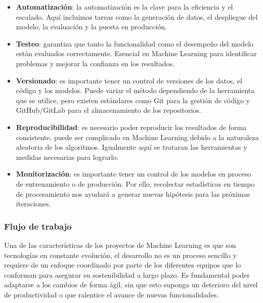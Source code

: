 \begin{itemize}
    \item \textbf{Automatización}: la automatización es la clave para la eficiencia y el escalado.
          Aquí incluimos tareas como la generación de datos, el despliegue del modelo, la evaluación y
          la puesta en producción.
    \item \textbf{Testeo}: garantiza que tanto la funcionalidad como el desempeño del modelo están evaluados correctamente.
          Esencial en Machine Learning para identificar problemas y mejorar la confianza en los resultados.
    \item \textbf{Versionado}: es importante tener un control de versiones de los datos, el código y los modelos.
          Puede variar el método dependiendo de la herramienta que se utilice, pero existen estándares como Git para la gestión
          de código y GitHub/GitLab para el almacenamiento de los repositorios.
    \item \textbf{Reproducibilidad}: es necesario poder reproducir los resultados de forma consistente, puede ser
          complicado en Machine Learning debido a la naturaleza aleatoria de los algoritmos. Igualmente aquí se trataran
          las herramientas y medidas necesarias para lograrlo.
    \item \textbf{Monitorización}: es importante tener un control de los modelos en proceso de entrenamiento o de producción.
          Por ello, recolectar estadísticas en tiempo de procesamiento nos ayudará a generar nuevas hipótesis para las próximas 
          iteraciones.
\end{itemize}

\subsubsection{Flujo de trabajo}
Una de las características de los proyectos de Machine Learning es que son tecnologías en constante evolución, el
desarrollo no es un proceso sencillo y requiere de un enfoque coordinado por parte de los diferentes
equipos que lo conforman para asegurar su sostenibilidad a largo plazo. Es fundamental poder adaptarse a los cambios
de forma ágil, sin que esto suponga un deterioro del nivel de productividad o que ralentice el avance de nuevas
funcionalidades.\medskip

